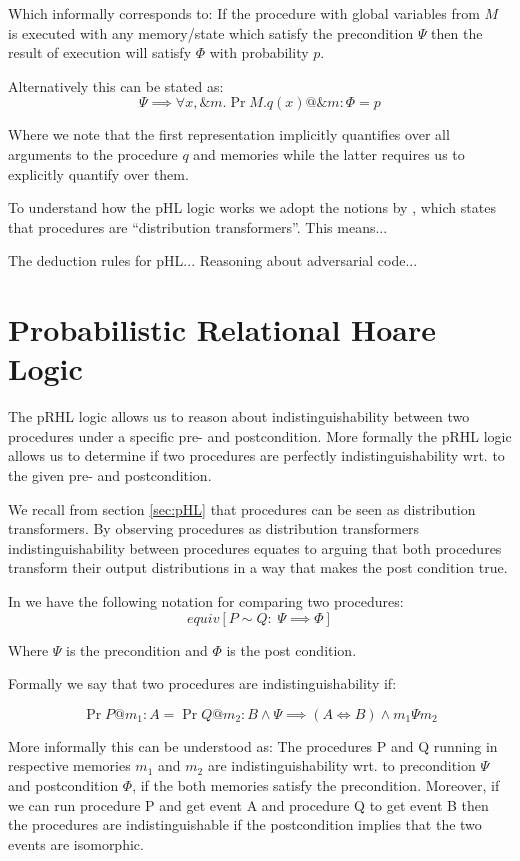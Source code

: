Which informally corresponds to: If the procedure with global variables from $M$
is executed with any memory/state which satisfy the precondition $\Psi$ then the
result of execution will satisfy $\Phi$ with probability $p$.

Alternatively this can be stated as:
\begin{equation}
  \label{eq:proc_pr}
  \Psi \implies \forall x, \&m.\Pr{M.q(x) @ \&m : \Phi} = p
\end{equation}

Where we note that the first representation implicitly quantifies over all
arguments to the procedure $q$ and memories while the latter requires us to explicitly
quantify over them.

To understand how the pHL logic works we adopt the notions by \citet{ec_intro},
which states that procedures are ``distribution transformers''.
This means...

The deduction rules for pHL...
Reasoning about adversarial code...

\section{Probabilistic Relational Hoare Logic}
\label{sec:pRHL}
The pRHL logic allows us to reason about indistinguishability between two
procedures under a specific pre- and postcondition. More formally the pRHL logic
allows us to determine if two procedures are perfectly indistinguishability wrt.
to the given pre- and postcondition.

We recall from section \ref{sec:pHL} that procedures can be seen as distribution
transformers. By observing procedures as distribution transformers
indistinguishability between procedures equates to arguing that both procedures
transform their output distributions in a way that makes the post condition
true.

In \easycrypt we have the following notation for comparing two procedures:
\[
  equiv[P \sim Q :\; \Psi \implies \Phi ]
\]

Where $\Psi$ is the precondition and $\Phi$ is the post condition.

Formally we say that two procedures are indistinguishability if:

\[
  \Pr{P @ m_{1} : A} = \Pr{Q @ m_{2} : B} \land \Psi \implies (A \iff B) \land m_{1} \Psi m_{2}
\]

More informally this can be understood as: The procedures P and Q running in
respective memories $m_{1}$ and $m_{2}$ are indistinguishability wrt. to
precondition $\Psi$ and postcondition $\Phi$, if the both memories satisfy the
precondition. Moreover, if we can run procedure P and get event A and
procedure Q to get event B then the procedures are indistinguishable if the
postcondition implies that the two events are isomorphic.


